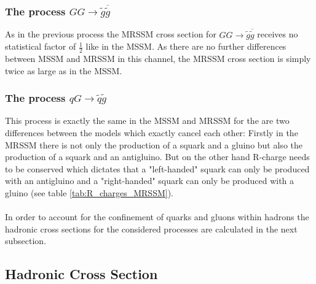 \subsubsection*{The process $GG \to \tilde{g}\overline{\tilde{g}}$}
As in the previous process the MRSSM cross section for $GG \to \tilde{g}\overline{\tilde{g}}$ receives no statistical factor of $\frac{1}{2}$ like in the MSSM. As there are no further differences between MSSM and MRSSM in this channel, the MRSSM cross section is simply twice as large as in the MSSM.

\subsubsection*{The process $q G \to \tilde{q} \tilde{g}$}
This process is exactly the same in the MSSM and MRSSM for the are two differences between the models which exactly cancel each other: Firstly in the MRSSM there is not only the production of a squark and a gluino but also the production of a squark and an antigluino. But on the other hand R-charge needs to be conserved which dictates that a "left-handed" squark can only be produced with an antigluino and a "right-handed" squark can only be produced with a gluino (see table \ref{tab:R_charges_MRSSM}).
\\ 
\\
In order to account for the confinement of quarks and gluons within hadrons the hadronic cross sections for the considered processes are calculated in the next subsection.



\subsection{Hadronic Cross Section}

